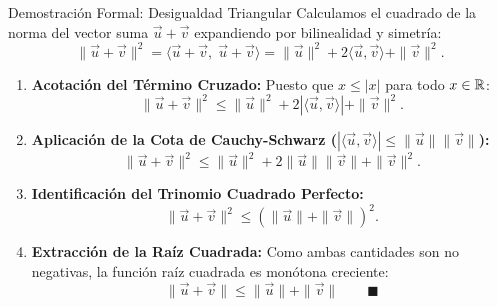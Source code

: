 \documentclass[10pt,aspectratio=169]{beamer}
\begin{document}
\begin{frame}{Demostración Formal: Desigualdad Triangular}
  \footnotesize
  Calculamos el cuadrado de la norma del vector suma $\vec{u}+\vec{v}$ expandiendo por bilinealidad y simetría:
  \[
  \|\vec{u} + \vec{v}\|^2 = \langle \vec{u} + \vec{v},\; \vec{u} + \vec{v} \rangle = \|\vec{u}\|^2 + 2\langle \vec{u}, \vec{v} \rangle + \|\vec{v}\|^2.
  \]
  \begin{enumerate}\itemsep4pt
    \item \textbf{Acotación del Término Cruzado:}
    Puesto que $x \le |x|$ para todo $x \in \mathbb{R}$:
    \[
    \|\vec{u} + \vec{v}\|^2 \le \|\vec{u}\|^2 + 2|\langle \vec{u}, \vec{v} \rangle| + \|\vec{v}\|^2.
    \]
    \item \textbf{Aplicación de la Cota de Cauchy-Schwarz ($|\langle \vec{u}, \vec{v} \rangle| \le \|\vec{u}\|\|\vec{v}\|$):}
    \[
    \|\vec{u} + \vec{v}\|^2 \le \|\vec{u}\|^2 + 2\|\vec{u}\|\|\vec{v}\| + \|\vec{v}\|^2.
    \]
    \item \textbf{Identificación del Trinomio Cuadrado Perfecto:}
    \[
    \|\vec{u} + \vec{v}\|^2 \le (\|\vec{u}\| + \|\vec{v}\|)^2.
    \]
    \item \textbf{Extracción de la Raíz Cuadrada:}
    Como ambas cantidades son no negativas, la función raíz cuadrada es monótona creciente:
    \[
    \boxed{\|\vec{u} + \vec{v}\| \le \|\vec{u}\| + \|\vec{v}\|} \qquad \blacksquare
    \]
  \end{enumerate}
\end{frame}
\end{document}
